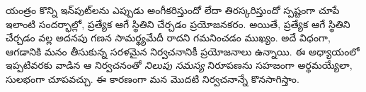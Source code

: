 \documentclass[../../../include/open-logic-section]{subfiles}
\begin{document}
\begin{explain}
యంత్రం కొన్ని ఇన్‌పుట్‌లను ఎప్పుడు అంగీకరిస్తుందో లేదా తిరస్కరిస్తుందో స్పష్టంగా
చూపే ఇలాంటి సందర్భాల్లో, ప్రత్యేక ఆగే స్థితిని చేర్చడం ప్రయోజనకరం. అయితే,
ప్రత్యేక ఆగే స్థితిని చేర్చడం వల్ల అదనపు గణన సామర్థ్యమేదీ రాదని గమనించడం
ముఖ్యం. అదే విధంగా, ఆగడానికి మనం తీసుకున్న సరళమైన నిర్వచనానికీ ప్రయోజనాలు
ఉన్నాయి. ఈ అధ్యాయంలో ఇప్పటివరకు వాడిన ఆ నిర్వచనంతో
\emph{నిలుపు సమస్య} నిరూపణను సహజంగా అర్థమయ్యేలా, సులభంగా చూపవచ్చు. ఈ కారణంగా మన మొదటి నిర్వచనాన్నే కొనసాగిస్తాం.
\end{explain}
\end{document}
